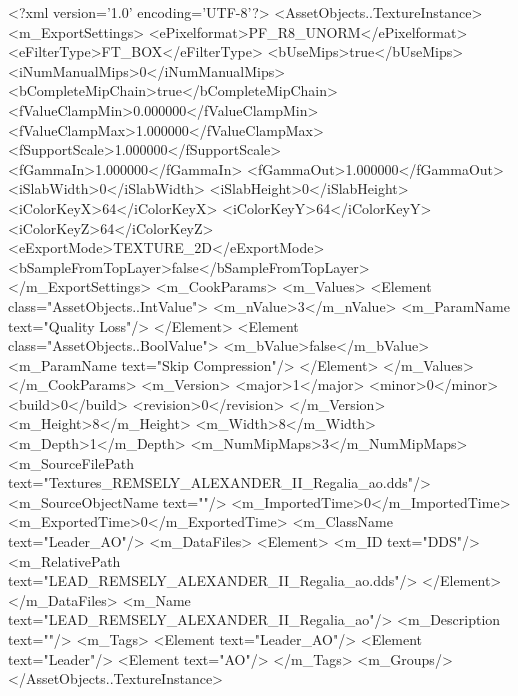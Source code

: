 <?xml version='1.0' encoding='UTF-8'?>
<AssetObjects..TextureInstance>
  <m_ExportSettings>
    <ePixelformat>PF_R8_UNORM</ePixelformat>
    <eFilterType>FT_BOX</eFilterType>
    <bUseMips>true</bUseMips>
    <iNumManualMips>0</iNumManualMips>
    <bCompleteMipChain>true</bCompleteMipChain>
    <fValueClampMin>0.000000</fValueClampMin>
    <fValueClampMax>1.000000</fValueClampMax>
    <fSupportScale>1.000000</fSupportScale>
    <fGammaIn>1.000000</fGammaIn>
    <fGammaOut>1.000000</fGammaOut>
    <iSlabWidth>0</iSlabWidth>
    <iSlabHeight>0</iSlabHeight>
    <iColorKeyX>64</iColorKeyX>
    <iColorKeyY>64</iColorKeyY>
    <iColorKeyZ>64</iColorKeyZ>
    <eExportMode>TEXTURE_2D</eExportMode>
    <bSampleFromTopLayer>false</bSampleFromTopLayer>
  </m_ExportSettings>
  <m_CookParams>
    <m_Values>
      <Element class="AssetObjects..IntValue">
        <m_nValue>3</m_nValue>
        <m_ParamName text="Quality Loss"/>
      </Element>
      <Element class="AssetObjects..BoolValue">
        <m_bValue>false</m_bValue>
        <m_ParamName text="Skip Compression"/>
      </Element>
    </m_Values>
  </m_CookParams>
  <m_Version>
    <major>1</major>
    <minor>0</minor>
    <build>0</build>
    <revision>0</revision>
  </m_Version>
  <m_Height>8</m_Height>
  <m_Width>8</m_Width>
  <m_Depth>1</m_Depth>
  <m_NumMipMaps>3</m_NumMipMaps>
  <m_SourceFilePath text="Textures\LEAD_REMSELY_ALEXANDER_II_Regalia_ao.dds"/>
  <m_SourceObjectName text=""/>
  <m_ImportedTime>0</m_ImportedTime>
  <m_ExportedTime>0</m_ExportedTime>
  <m_ClassName text="Leader_AO"/>
  <m_DataFiles>
    <Element>
      <m_ID text="DDS"/>
      <m_RelativePath text="LEAD_REMSELY_ALEXANDER_II_Regalia_ao.dds"/>
    </Element>
  </m_DataFiles>
  <m_Name text="LEAD_REMSELY_ALEXANDER_II_Regalia_ao"/>
  <m_Description text=""/>
  <m_Tags>
    <Element text="Leader_AO"/>
    <Element text="Leader"/>
    <Element text="AO"/>
  </m_Tags>
  <m_Groups/>
</AssetObjects..TextureInstance>
